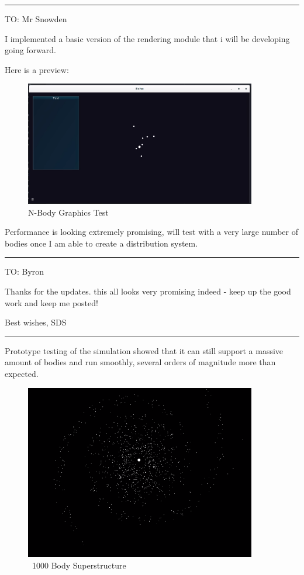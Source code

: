 {\pagebreak
\hrule

TO: Mr Snowden

I implemented a basic version of the rendering module that i will be developing going forward.

Here is a preview:

\begin{figure}[H]
  \centering
  \includegraphics[width=0.9\textwidth]{img/pEcho.png}
  \caption{N-Body Graphics Test}
\end{figure}

Performance is looking extremely promising, will test with a very large number of bodies once I am able to create a distribution system.

\vspace{8pt}
\hrule

TO: Byron

Thanks for the updates. this all looks very promising indeed - keep up the good work and keep me posted!

Best wishes,
SDS

\vspace{8pt}
\hrule

Prototype testing of the simulation showed that it can still support a massive amount of bodies and run smoothly, several orders of magnitude more than expected.

\begin{figure}[!ht]
  \centering
  \includegraphics[width=0.9\textwidth]{img/superstructure.png}
  \caption{~1000 Body Superstructure}
\end{figure}

}
